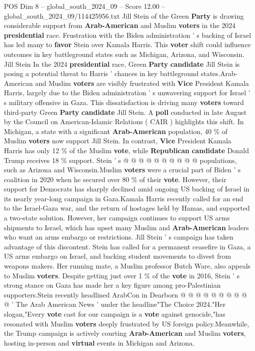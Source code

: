 \begin{textsample}{POS Dim 8 – global\_south\_2024\_09 – Score 12.00 – global\_south\_2024\_09/114425956.txt}  \label{ex:f8_pos_249}
Jill Stein of the Green \textbf{Party} is drawing considerable support from \textbf{Arab-American} and Muslim \textbf{voters} in the 2024 \textbf{presidential} race.
Frustration with the Biden administration ' s backing of Israel has led many to \textbf{favor} Stein over Kamala Harris.
This \textbf{voter} shift could influence outcomes in key battleground states such as Michigan, Arizona, and Wisconsin.
Jill Stein In the 2024 \textbf{presidential} race, Green \textbf{Party} \textbf{candidate} Jill Stein is posing a potential threat to Harris ' chances in key battleground states.Arab-American and Muslim \textbf{voters} are visibly frustrated with \textbf{Vice} President Kamala Harris, largely due to the Biden administration ' s unwavering support for Israel ' s military offensive in Gaza.
This dissatisfaction is driving many \textbf{voters} toward third-party Green \textbf{Party} \textbf{candidate} Jill Stein.
A \textbf{poll} conducted in late August by the Council on American-Islamic Relations ( CAIR ) highlights this shift.
In Michigan, a state with a significant \textbf{Arab-American} population, 40 \% of Muslim \textbf{voters} now support Jill Stein.
In contrast, \textbf{Vice} President Kamala Harris has only 12 \% of the Muslim \textbf{vote}, while \textbf{Republican} \textbf{candidate} Donald Trump receives 18 \% support.
Stein ' s @ @ @ @ @ @ @ @ @ @ populations, such as Arizona and Wisconsin.Muslim \textbf{voters} were a crucial part of Biden ' s coalition in 2020 when he secured over 80 \% of their \textbf{vote}.
However, their support for Democrats has sharply declined amid ongoing US backing of Israel in its nearly year-long campaign in Gaza.Kamala Harris recently called for an end to the Israel-Gaza war, and the return of hostages held by Hamas, and supported a two-state solution.
However, her campaign continues to support US arms shipments to Israel, which has upset many Muslim and \textbf{Arab-American} leaders who want an arms embargo or restrictions.
Jill Stein ' s campaign has taken advantage of this discontent.
Stein has called for a permanent ceasefire in Gaza, a US arms embargo on Israel, and backing student movements to divest from weapons makers.
Her running mate, a Muslim professor Butch Ware, also appeals to Muslim \textbf{voters}.
Despite getting just over 1 \% of the \textbf{vote} in 2016, Stein ' s strong stance on Gaza has made her a key figure among pro-Palestinian supporters.Stein recently headlined ArabCon in Dearborn @ @ @ @ @ @ @ @ @ @ ' The Arab American News ' under the headline"The Choice 2024."Her slogan,"Every \textbf{vote} cast for our campaign is a \textbf{vote} against genocide,"has resonated with Muslim \textbf{voters} deeply frustrated by US foreign policy.Meanwhile, the Trump campaign is actively courting \textbf{Arab-American} and Muslim \textbf{voters}, hosting in-person and \textbf{virtual} events in Michigan and Arizona.

\end{textsample}
